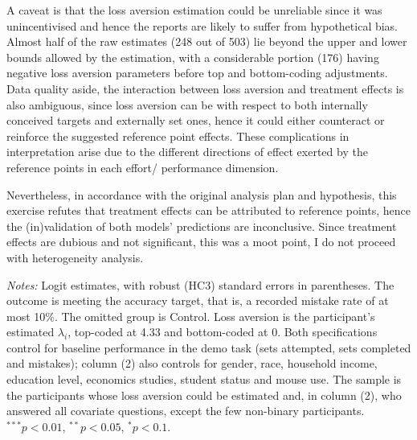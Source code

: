 \documentclass[12pt, letterpaper]{article}
\begin{document}
A caveat is that the loss aversion estimation could be unreliable since it was unincentivised and hence the reports are likely to suffer from hypothetical bias. Almost half of the raw estimates (248 out of 503) lie beyond the upper and lower bounds allowed by the estimation, with a considerable portion (176) having negative loss aversion parameters before top and bottom-coding adjustments. Data quality aside, the interaction between loss aversion and treatment effects is also ambiguous, since loss aversion can be with respect to both internally conceived targets and externally set ones, hence it could either counteract or reinforce the suggested reference point effects. These complications in interpretation arise due to the different directions of effect exerted by the reference points in each effort/ performance dimension.

Nevertheless, in accordance with the original analysis plan and hypothesis, this exercise refutes that treatment effects can be attributed to reference points, hence the (in)validation of both models' predictions are inconclusive. Since treatment effects are dubious and not significant, this was a moot point, I do not proceed with heterogeneity analysis.

\begin{table}
\centering
\begin{threeparttable}

\begin{tablenotes}[flushleft]
\footnotesize
\item \textit{Notes:} Logit estimates, with robust (HC3) standard errors in parentheses. The outcome is meeting the accuracy target, that is, a recorded mistake rate of at most 10\%. The omitted group is Control. Loss aversion is the participant's estimated $\lambda_i$, top-coded at 4.33 and bottom-coded at 0. Both specifications control for baseline performance in the demo task (sets attempted, sets completed and mistakes); column (2) also controls for gender, race, household income, education level, economics studies, student status and mouse use. The sample is the participants whose loss aversion could be estimated and, in column (2), who answered all covariate questions, except the few non-binary participants. $^{***}p<0.01$, $^{**}p<0.05$, $^{*}p<0.1$.
\end{tablenotes}
\end{threeparttable}
\caption{Treatment effects on target achievement interacted with loss aversion}\label{tab:reg-target-la}
\end{table}
\end{document}
